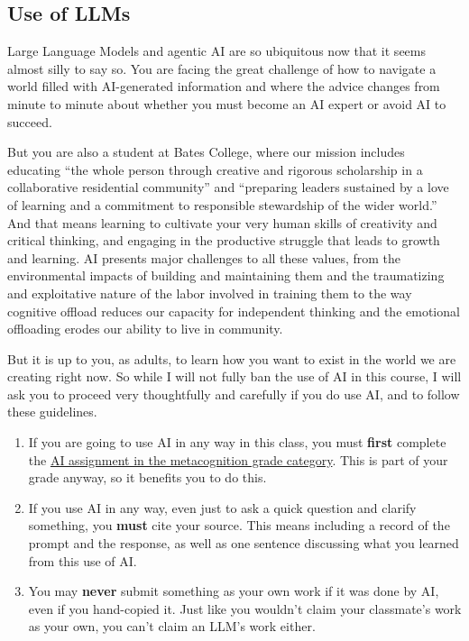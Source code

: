 \documentclass[
  letterpaper,
  DIV=11,
  numbers=noendperiod]{scrartcl}
\begin{document}
\subsection{Use of LLMs}\label{llms}

Large Language Models and agentic AI are so ubiquitous now that it seems
almost silly to say so. You are facing the great challenge of how to
navigate a world filled with AI-generated information and where the
advice changes from minute to minute about whether you must become an AI
expert or avoid AI to succeed.

But you are also a student at Bates College, where our mission includes
educating ``the whole person through creative and rigorous scholarship
in a collaborative residential community'' and ``preparing leaders
sustained by a love of learning and a commitment to responsible
stewardship of the wider world.'' And that means learning to cultivate
your very human skills of creativity and critical thinking, and engaging
in the productive struggle that leads to growth and learning. AI
presents major challenges to all these values, from the environmental
impacts of building and maintaining them and the traumatizing and
exploitative nature of the labor involved in training them to the way
cognitive offload reduces our capacity for independent thinking and the
emotional offloading erodes our ability to live in community.

But it is up to you, as adults, to learn how you want to exist in the
world we are creating right now. So while I will not fully ban the use
of AI in this course, I will ask you to proceed very thoughtfully and
carefully if you do use AI, and to follow these guidelines.

\begin{enumerate}
\def\labelenumi{\arabic{enumi}.}
\item
  If you are going to use AI in any way in this class, you must
  \textbf{first} complete the \hyperref[metacognitiongrade]{AI
  assignment in the metacognition grade category}. This is part of your
  grade anyway, so it benefits you to do this.
\item
  If you use AI in any way, even just to ask a quick question and
  clarify something, you \textbf{must} cite your source. This means
  including a record of the prompt and the response, as well as one
  sentence discussing what you learned from this use of AI.
\item
  You may \textbf{never} submit something as your own work if it was
  done by AI, even if you hand-copied it. Just like you wouldn't claim
  your classmate's work as your own, you can't claim an LLM's work
  either.
\end{enumerate}
\end{document}
